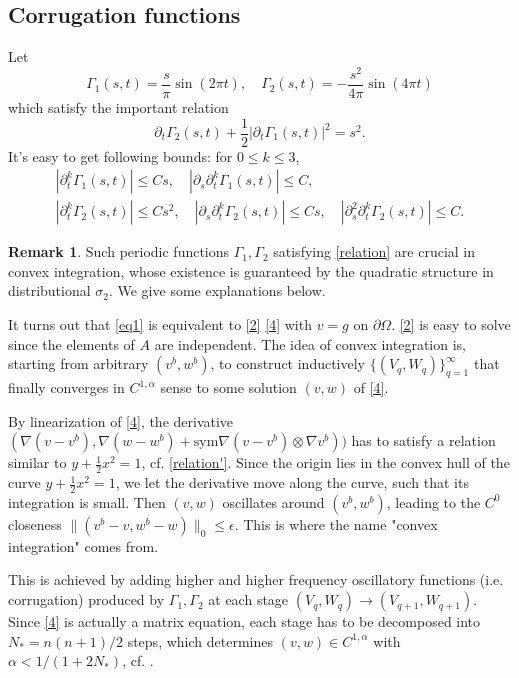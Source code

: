 \documentclass[reqno,12pt]{amsart}
\numberwithin{equation}{section}
\theoremstyle{plain}
\theoremstyle{definition}
\newtheorem{rem}[thm]{Remark}
\newcommand{\sym}{\text{sym}}
\begin{document}
\subsection{Corrugation functions}
Let
\begin{equation*}
\Gamma_1(s,t)=\frac{s}{\pi}\sin(2\pi t),\quad\Gamma_2(s,t)=-\frac{s^2}{4\pi}\sin(4\pi t)
\end{equation*}
which satisfy the important relation
\begin{equation}\label{relation}
    \partial_t\Gamma_2(s,t)+\frac{1}{2}|\partial_t\Gamma_1(s,t)|^2=s^2.
\end{equation}
It's easy to get following bounds: for $0\le k\le 3$,
\begin{equation}\label{bounds}
\begin{aligned}
    |\partial_t^k\Gamma_1(s,t)|\le Cs,\quad |\partial_s\partial_t^k\Gamma_1(s,t)|\le C,\\
    |\partial_t^k\Gamma_2(s,t)|\le Cs^2,\quad |\partial_s\partial_t^k\Gamma_2(s,t)|\le Cs,\quad |\partial_s^2\partial_t^k\Gamma_2(s,t)|\le C.
\end{aligned}
\end{equation}
\begin{rem}\label{rem1}
    Such periodic functions $\Gamma_1,\Gamma_2$ satisfying \eqref{relation} are crucial in convex integration, whose existence is guaranteed by the quadratic structure in distributional $\sigma_2$. We give some explanations below.
    
    It turns out that \eqref{eq1} is equivalent to \eqref{2} \eqref{4} with $v=g$ on $\partial\Omega$. \eqref{2} is easy to solve since the elements of $A$ are independent. The idea of convex integration is, starting from arbitrary $(v^b,w^b)$, to construct inductively $\{(V_q, W_q)\}_{q=1}^\infty$ that finally converges in $C^{1,\alpha}$ sense to some solution $(v,w)$ of \eqref{4}. 
    
    By linearization of \eqref{4}, the derivative $(\nabla (v-v^b),\nabla(w-w^b)+\sym \nabla(v-v^b)\otimes\nabla v^b))$ has to satisfy a relation similar to $y+\frac{1}{2}x^2=1$, cf. \eqref{relation'}. Since the origin lies in the convex hull of the curve $y+\frac{1}{2}x^2=1$, we let the derivative move along the curve, such that its integration is small. Then $(v,w)$ oscillates around $(v^b,w^b)$, leading to the $C^0$ closeness $\|(v^b-v,w^b-w)\|_0\le\epsilon$. This is where the name "convex integration" comes from. 
    
    This is achieved by adding higher and higher frequency oscillatory functions (i.e. corrugation) produced by $\Gamma_1,\Gamma_2$ at each stage $(V_q,W_q)\to (V_{q+1},W_{q+1})$. Since \eqref{4} is actually a matrix equation, each stage has to be decomposed into $N_*=n(n+1)/2$ steps, which determines $(v,w)\in C^{1,\alpha}$ with $\alpha<1/(1+2N_*)$, cf. \cite{cao19very,cao23c1frac13}.
\end{rem}
\end{document}
